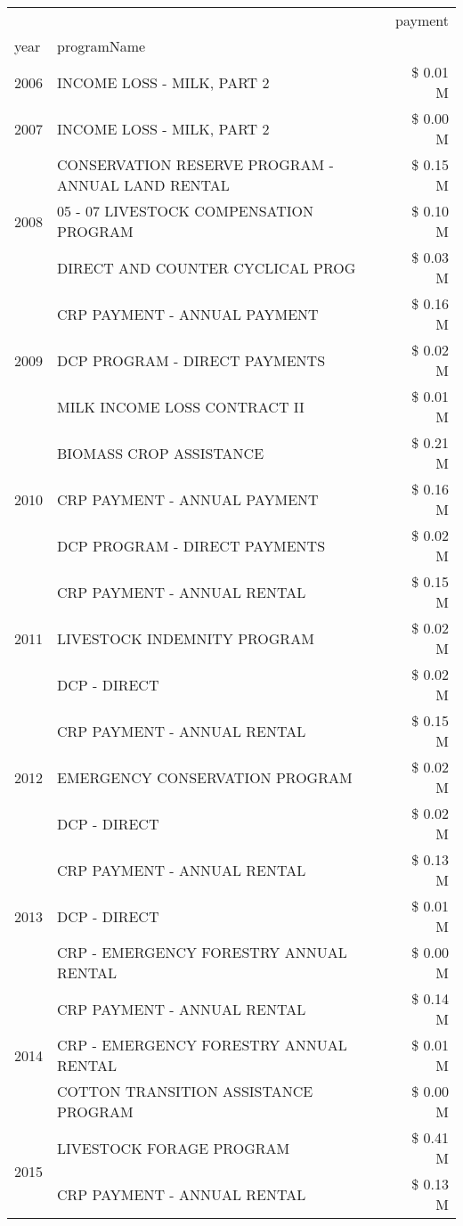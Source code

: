 \begin{tabular}{llr}
\toprule
 &  & payment \\
year & programName &  \\
\midrule
2006 & INCOME LOSS - MILK, PART 2 & \$ 0.01 M \\
\cline{1-3}
2007 & INCOME LOSS - MILK, PART 2 & \$ 0.00 M \\
\cline{1-3}
\multirow[t]{3}{*}{2008} & CONSERVATION RESERVE PROGRAM - ANNUAL LAND RENTAL & \$ 0.15 M \\
 & 05 - 07 LIVESTOCK COMPENSATION PROGRAM & \$ 0.10 M \\
 & DIRECT AND COUNTER CYCLICAL PROG & \$ 0.03 M \\
\cline{1-3}
\multirow[t]{3}{*}{2009} & CRP PAYMENT - ANNUAL PAYMENT & \$ 0.16 M \\
 & DCP PROGRAM - DIRECT PAYMENTS & \$ 0.02 M \\
 & MILK INCOME LOSS CONTRACT II & \$ 0.01 M \\
\cline{1-3}
\multirow[t]{3}{*}{2010} & BIOMASS CROP ASSISTANCE & \$ 0.21 M \\
 & CRP PAYMENT - ANNUAL PAYMENT & \$ 0.16 M \\
 & DCP PROGRAM - DIRECT PAYMENTS & \$ 0.02 M \\
\cline{1-3}
\multirow[t]{3}{*}{2011} & CRP PAYMENT - ANNUAL RENTAL & \$ 0.15 M \\
 & LIVESTOCK INDEMNITY PROGRAM & \$ 0.02 M \\
 & DCP - DIRECT & \$ 0.02 M \\
\cline{1-3}
\multirow[t]{3}{*}{2012} & CRP PAYMENT - ANNUAL RENTAL & \$ 0.15 M \\
 & EMERGENCY CONSERVATION PROGRAM & \$ 0.02 M \\
 & DCP - DIRECT & \$ 0.02 M \\
\cline{1-3}
\multirow[t]{3}{*}{2013} & CRP PAYMENT - ANNUAL RENTAL & \$ 0.13 M \\
 & DCP - DIRECT & \$ 0.01 M \\
 & CRP - EMERGENCY FORESTRY ANNUAL RENTAL & \$ 0.00 M \\
\cline{1-3}
\multirow[t]{3}{*}{2014} & CRP PAYMENT - ANNUAL RENTAL & \$ 0.14 M \\
 & CRP - EMERGENCY FORESTRY ANNUAL RENTAL & \$ 0.01 M \\
 & COTTON TRANSITION ASSISTANCE PROGRAM & \$ 0.00 M \\
\cline{1-3}
\multirow[t]{3}{*}{2015} & LIVESTOCK FORAGE PROGRAM & \$ 0.41 M \\
 & CRP PAYMENT - ANNUAL RENTAL & \$ 0.13 M \\

\end{tabular}
